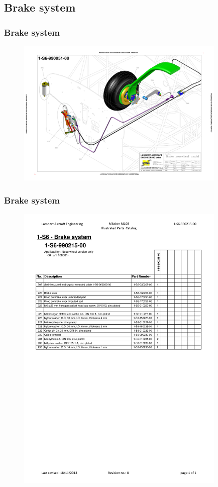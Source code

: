 \documentclass{beamer}
\begin{document}
\subsection{Brake system}

\begin{frame}\frametitle{Brake system}
\begin{figure}[ht!]
	\begin{center}
		\includegraphics[width=10cm,trim = 1.5cm 2.5cm 1.5cm 2.5cm, clip]{pics/PIC019.pdf}
		\label{fig:PIC019}
	\end{center}
\end{figure}
\end{frame}

\begin{frame}\frametitle{Brake system}
\begin{figure}[ht!]
	\begin{center}
		\includegraphics[width=10cm,trim = 1cm 8cm 1cm 2.25cm, clip]{pics/PIC011.pdf}
		\label{fig:PIC011}
	\end{center}
\end{figure}
\end{frame}
\end{document}
